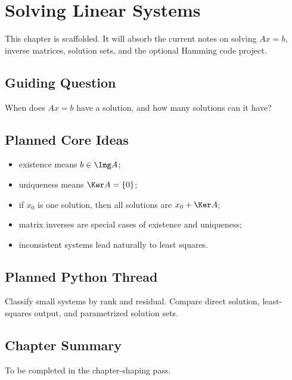 \chapter{Solving Linear Systems}
\label{ch:solving-linear-systems}

\begin{draftbox}
This chapter is scaffolded. It will absorb the current notes on solving
$Ax=b$, inverse matrices, solution sets, and the optional Hamming code project.
\end{draftbox}

\section{Guiding Question}

When does $Ax=b$ have a solution, and how many solutions can it have?

\section{Planned Core Ideas}

\begin{itemize}
  \item existence means $b\in\Img A$;
  \item uniqueness means $\Ker A=\{0\}$;
  \item if $x_0$ is one solution, then all solutions are
    $x_0+\Ker A$;
  \item matrix inverses are special cases of existence and uniqueness;
  \item inconsistent systems lead naturally to least squares.
\end{itemize}

\section{Planned Python Thread}

Classify small systems by rank and residual. Compare direct solution,
least-squares output, and parametrized solution sets.

\section*{Chapter Summary}

To be completed in the chapter-shaping pass.


